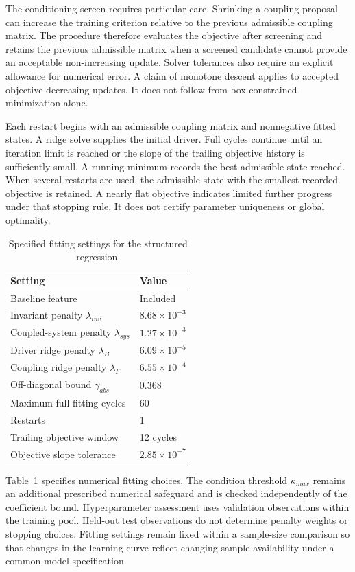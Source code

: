 The conditioning screen requires particular care. Shrinking a coupling proposal can increase the training criterion relative to the previous admissible coupling matrix. The procedure therefore evaluates the objective after screening and retains the previous admissible matrix when a screened candidate cannot provide an acceptable non-increasing update. Solver tolerances also require an explicit allowance for numerical error. A claim of monotone descent applies to accepted objective-decreasing updates. It does not follow from box-constrained minimization alone.

Each restart begins with an admissible coupling matrix and nonnegative fitted states. A ridge solve supplies the initial driver. Full cycles continue until an iteration limit is reached or the slope of the trailing objective history is sufficiently small. A running minimum records the best admissible state reached. When several restarts are used, the admissible state with the smallest recorded objective is retained. A nearly flat objective indicates limited further progress under that stopping rule. It does not certify parameter uniqueness or global optimality.

\begin{table}[htbp]
\centering
\caption{Specified fitting settings for the structured regression.}
\label{tab:icsor_fitting_settings}
\begin{tabular}{ll}
\toprule
Setting & Value\\
\midrule
Baseline feature & Included\\
Invariant penalty \(\lambda_{inv}\) & \(8.68\times10^{-3}\)\\
Coupled-system penalty \(\lambda_{sys}\) & \(1.27\times10^{-3}\)\\
Driver ridge penalty \(\lambda_B\) & \(6.09\times10^{-5}\)\\
Coupling ridge penalty \(\lambda_{\Gamma}\) & \(6.55\times10^{-4}\)\\
Off-diagonal bound \(\gamma_{abs}\) & 0.368\\
Maximum full fitting cycles & 60\\
Restarts & 1\\
Trailing objective window & 12 cycles\\
Objective slope tolerance & \(2.85\times10^{-7}\)\\
\bottomrule
\end{tabular}
\end{table}

Table~\ref{tab:icsor_fitting_settings} specifies numerical fitting choices. The condition threshold \(\kappa_{max}\) remains an additional prescribed numerical safeguard and is checked independently of the coefficient bound. Hyperparameter assessment uses validation observations within the training pool. Held-out test observations do not determine penalty weights or stopping choices. Fitting settings remain fixed within a sample-size comparison so that changes in the learning curve reflect changing sample availability under a common model specification.

